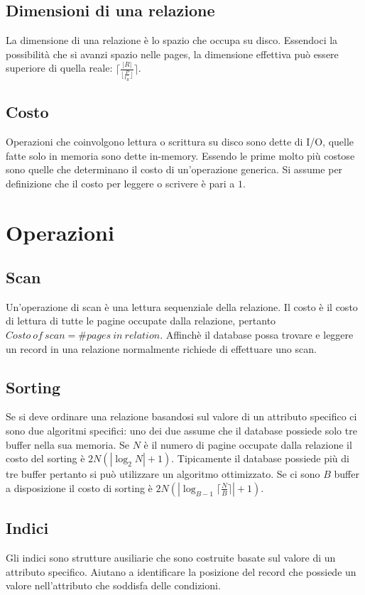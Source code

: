 \subsection{Dimensioni di una relazione}
La dimensione di una relazione \`e lo spazio che occupa su disco. Essendoci la possibilit\`a che si avanzi spazio nelle pages, la dimensione effettiva pu\`o
essere superiore di quella reale: $\lceil\frac{|R|}{\lfloor\frac{P}{t_R}\rfloor}\rceil$.
\subsection{Costo}
Operazioni che coinvolgono lettura o scrittura su disco sono dette di I/O, quelle fatte solo in memoria sono dette in-memory. Essendo le prime molto pi\`u costose sono quelle che determinano il costo di 
un'operazione generica. Si assume per definizione che il costo per leggere o scrivere \`e pari a $1$. 
\section{Operazioni}
\subsection{Scan}
Un'operazione di scan \`e una lettura sequenziale della relazione. Il costo \`e il costo di lettura di tutte le pagine occupate dalla relazione, pertanto $Costo\ of\ scan= \# pages\ in\ relation$. Affinch\`e il database
possa trovare e leggere un record in una relazione normalmente richiede di effettuare uno scan. 
\subsection{Sorting}
Se si deve ordinare una relazione basandosi sul valore di un attributo specifico ci sono due algoritmi specifici: uno dei due assume che il database possiede solo tre buffer nella sua memoria. Se $N$ \`e il numero di
pagine occupate dalla relazione il costo del sorting \`e $2N(|\log_2 N|+1)$. Tipicamente il database possiede pi\`u di tre buffer pertanto si pu\`o utilizzare un algoritmo ottimizzato. Se ci sono $B$ buffer a 
disposizione il costo di sorting \`e $2N(|\log_{B-1}\lceil \frac{N}{B}\rceil|+1)$.
\subsection{Indici}
Gli indici sono strutture ausiliarie che sono costruite basate sul valore di un attributo specifico. Aiutano a identificare la posizione del record che possiede un valore nell'attributo che soddisfa delle condizioni. 
